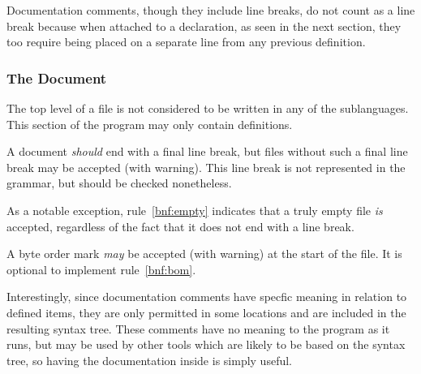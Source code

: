 Documentation comments, though they include line breaks, do not count as a line
break because when attached to a declaration, as seen in the next section, they
too require being placed on a separate line from any previous definition.

\subsubsection{The Document}

The top level of a \Trilogy{} file is not considered to be written in any
of the sublanguages. This section of the program may only contain definitions.

A \Trilogy{} document \emph{should} end with a final line break, but files
without such a final line break may be accepted (with warning). This line break
is not represented in the grammar, but should be checked nonetheless.

As a notable exception, rule~\ref{bnf:empty} indicates that a truly empty
file \emph{is} accepted, regardless of the fact that it does not end with
a line break.

A byte order mark \emph{may} be accepted (with warning) at the start of
the file. It is optional to implement rule~\ref{bnf:bom}.

Interestingly, since documentation comments have specfic meaning in relation
to defined items, they are only permitted in some locations and are included
in the resulting syntax tree. These comments have no meaning to the program
as it runs, but may be used by other tools which are likely to be based on the
syntax tree, so having the documentation inside is simply useful.

